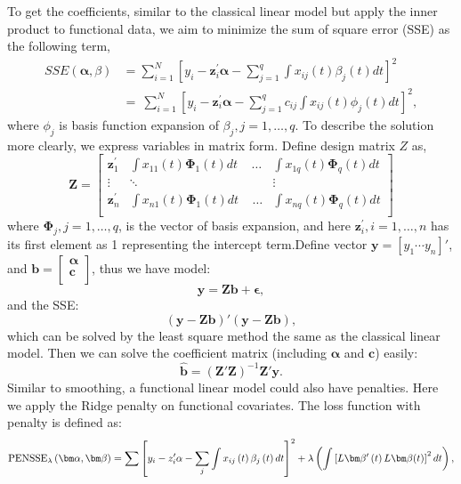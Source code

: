 To get the coefficients, similar to the classical linear model but apply the inner product to functional data, we aim to minimize the sum of square error (SSE) as the following term,\\
\begin{align*}
SSE\left(\bm \alpha,\beta\right)&=\sum_{i=1}^N\left[y_i-\bm{z}_{i}^\prime\bm{\alpha}-\sum_{j=1}^{q}\int x_{ij}\left(t\right)\beta_j\left(t\right)dt\right]^2\\
&=\ \sum_{i=1}^{N}\left[y_i-\bm{z}_{i}^\prime\bm{\alpha}-\sum_{j=1}^{q}c_{ij}\int x_{ij}\left(t\right)\phi_j\left(t\right)dt\right]^2,
\end{align*}
where $\phi_j$ is basis function expansion of $\beta_j,j=1,\ldots ,q$. To describe the solution more clearly, we express variables in matrix form. Define design matrix $Z$ as,\\
$$\mathbf{Z}=\left[\begin{matrix}\mathbf{z}_{1}^\prime&\int{x_{11}\left(t\right)\mathbf{\Phi}_{1}\left(t\right)dt}\ \ \ \ \ \ldots&\int{x_{1q}\left(t\right)\mathbf{\Phi}_{q}\left(t\right)dt}\\\vdots&\ddots\ &\vdots\\\mathbf{z}_{n}^\prime&\int{x_{n1}\left(t\right)\mathbf{\Phi}_{1}\left(t\right)dt\ }\ \ \ \ \ldots&\int{x_{nq}\left(t\right)\mathbf{\Phi}_{q}\left(t\right)dt}\\\end{matrix}\right]$$
where $\bm{\Phi}_{j},j=1,\dots,q$, is the vector of basis expansion, and here $ \bm {z}_{i}^\prime, i=1,\dots,n$ has its first element as 1 representing the intercept term.Define vector $\bm{y}=[y_1\cdots y_n]'$, and $\bm{b}=\left[\begin{matrix}\bm{\alpha}\\\bm{c}\\\end{matrix}\right]$, thus we have model:
$$\bm{y}=\bm{Zb}+\bm{\epsilon},$$
and the SSE:
$$(\bm{y}-\bm{Zb})'(\bm{y}-\bm{Zb}),$$
which can be solved by the least square method the same as the classical linear model. Then we can solve the coefficient matrix (including $\bm{\alpha}$ and $\bm c$) easily: 
$$\hat{\bm{b}}=\left(\bm{Z}'\bm{Z}\right)^{-{1}}\bm{Z}'\bm{y}.$$
Similar to smoothing, a functional linear model could also have penalties. Here we apply the Ridge penalty on functional covariates. The loss function with penalty is defined as:
$${\rm PENSSE}_\lambda\left(\bm \alpha,\bm \beta\right)=\sum\left[y_i-z_i'\alpha-\sum_{j}\int{x_{ij}\left(t\right)\beta_j\left(t\right)dt}\right]^2+\lambda\left(\int{\left[L \bm \beta'\left(t\right) L\bm \beta (t) \right]^2dt}\right),$$
